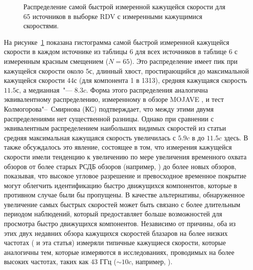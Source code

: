 \begin{figure}[]
 \caption{Распределение самой быстрой измеренной кажущейся скорости для 65 источников в выборке RDV
с измеренными кажущимися скоростями.}
 \label{fig:rdv_max_speed_dist}
\end{figure}

На рисунке~\ref{fig:rdv_max_speed_dist} показана гистограмма самой быстрой измеренной кажущейся
скорости в каждом источнике из таблицы 6 для всех источников в таблице 6 с измеренным красным
смещением ($N = 65$). Это распределение имеет пик при кажущейся скорости около $5с$, длинный хвост,
простирающийся до максимальной кажущейся скорости $44с$ (для компонента 1 в 1313),
средняя кажущаяся скорость $11.5с$, а медианная~"--- $8.3c$. Форма этого распределения аналогична
эквивалентному распределению, измеренному в обзоре MOJAVE \cite{Lister_2009b}, и тест
Колмогорова"--~Смирнова (КС) подтверждает, что между этими двумя распределениями нет существенной
разницы. Однако при сравнении с эквивалентным распределением наибольших видимых скоростей из статьи
\cite{Piner_2007} средняя максимальная кажущаяся скорость увеличилась с $5.9c$ в \cite{Piner_2007}
до $11.5c$ здесь. В \cite{Lister_2009b} также обсуждалось это явление, состоящее в том, что
измерения кажущейся скорости имели тенденцию к увеличению по мере увеличения временного охвата
обзоров от более старых РСДБ обзоров (например, \cite{Britzen_2008,Piner_2007}) до более новых
обзоров, показывая, что высокое угловое разрешение и превосходное временное покрытие могут облегчить
идентификацию быстро движущихся компонентов, которые в противном случае были бы пропущены. В
качестве альтернативы, обнаруженное увеличение самых быстрых скоростей может быть связано с более
длительным периодом наблюдений, который предоставляет больше возможностей для просмотра быстро
движущихся компонентов. Независимо от причины, оба из этих двух недавних обзора кажущихся скоростей
блазаров на более низких частотах (\cite{Lister_2009b} и эта статья) измеряли типичные кажущиеся
скорости, которые аналогичны тем, которые измеряются в исследованиях, проводимых на более высоких
частотах, таких как 43 ГГц ($\sim10c$, например, \cite{Jorstad_2005}).

